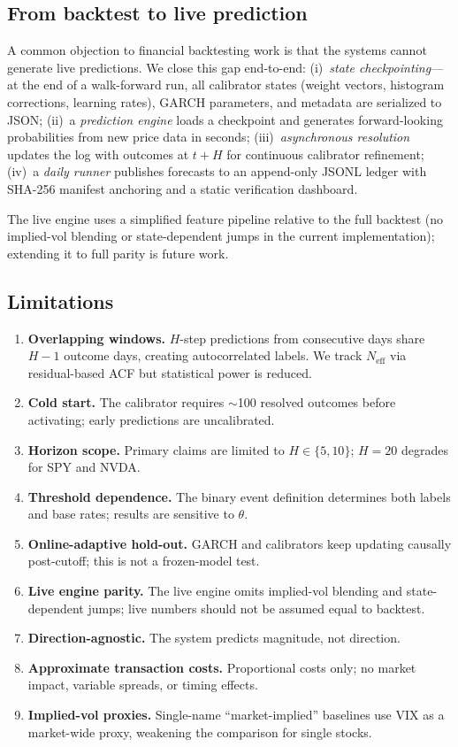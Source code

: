 \documentclass[11pt,a4paper]{article}
\newcommand{\Neff}{N_{\text{eff}}}
\begin{document}
\subsection{From backtest to live prediction}

A common objection to financial backtesting work is that the systems cannot generate live predictions. We close this gap end-to-end:
(i)~\emph{state checkpointing}---at the end of a walk-forward run, all calibrator states (weight vectors, histogram corrections, learning rates), GARCH parameters, and metadata are serialized to JSON;
(ii)~a \emph{prediction engine} loads a checkpoint and generates forward-looking probabilities from new price data in seconds;
(iii)~\emph{asynchronous resolution} updates the log with outcomes at $t+H$ for continuous calibrator refinement;
(iv)~a \emph{daily runner} publishes forecasts to an append-only JSONL ledger with SHA-256 manifest anchoring and a static verification dashboard.

The live engine uses a simplified feature pipeline relative to the full backtest (no implied-vol blending or state-dependent jumps in the current implementation); extending it to full parity is future work.

\subsection{Limitations}

\begin{enumerate}
  \item \textbf{Overlapping windows.} $H$-step predictions from consecutive days share $H{-}1$ outcome days, creating autocorrelated labels. We track $\Neff$ via residual-based ACF but statistical power is reduced.
  \item \textbf{Cold start.} The calibrator requires $\sim$100 resolved outcomes before activating; early predictions are uncalibrated.
  \item \textbf{Horizon scope.} Primary claims are limited to $H \in \{5, 10\}$; $H\!=\!20$ degrades for SPY and NVDA.
  \item \textbf{Threshold dependence.} The binary event definition determines both labels and base rates; results are sensitive to $\theta$.
  \item \textbf{Online-adaptive hold-out.} GARCH and calibrators keep updating causally post-cutoff; this is not a frozen-model test.
  \item \textbf{Live engine parity.} The live engine omits implied-vol blending and state-dependent jumps; live numbers should not be assumed equal to backtest.
  \item \textbf{Direction-agnostic.} The system predicts magnitude, not direction.
  \item \textbf{Approximate transaction costs.} Proportional costs only; no market impact, variable spreads, or timing effects.
  \item \textbf{Implied-vol proxies.} Single-name ``market-implied'' baselines use VIX as a market-wide proxy, weakening the comparison for single stocks.
\end{enumerate}
\end{document}
